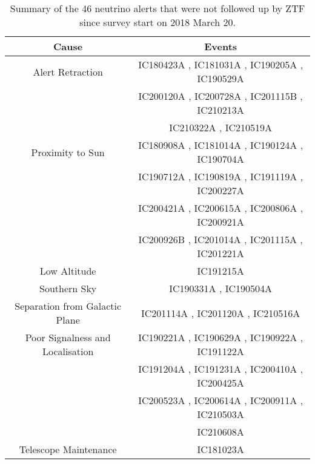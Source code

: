 \begin{table*}
	\centering
	\begin{tabular}{||c c ||} 
		\hline
		\textbf{Cause} & \textbf{Events} \\
		\hline
		Alert Retraction & IC180423A \cite{ic180423a}, IC181031A \cite{ic181031a}, IC190205A \cite{ic190205a}, IC190529A \cite{ic190529a} \\ 
		& IC200120A \cite{ic200120a}, IC200728A \cite{ic200728a}, IC201115B \cite{ic201115b}, IC210213A \cite{ic210213a} \\ 
		& IC210322A \cite{ic210322a}, IC210519A \cite{ic210519a} \\ 
		\hline 
		Proximity to Sun & IC180908A \cite{ic180908a}, IC181014A \cite{ic181014a}, IC190124A \cite{ic190124a}, IC190704A \cite{ic190704a} \\ 
		& IC190712A \cite{ic190712a}, IC190819A \cite{ic190819a}, IC191119A \cite{ic191119a}, IC200227A \cite{ic200227a} \\ 
		& IC200421A \cite{ic200421a}, IC200615A \cite{ic200615a}, IC200806A \cite{ic200806a}, IC200921A \cite{ic200921a} \\ 
		& IC200926B \cite{ic200926b}, IC201014A \cite{ic201014a}, IC201115A \cite{ic201115a}, IC201221A \cite{ic201221a} \\ 
		Low Altitude & IC191215A \cite{ic191215a} \\ 
		Southern Sky & IC190331A \cite{ic190331a}, IC190504A \cite{ic190504a} \\ 
		Separation from Galactic Plane & IC201114A \cite{ic201114a}, IC201120A \cite{ic201120a}, IC210516A \cite{ic210516a} \\ 
		\hline 
		Poor Signalness and Localisation & IC190221A \cite{ic190221a}, IC190629A \cite{ic190629a}, IC190922A \cite{ic190922a}, IC191122A \cite{ic191122a} \\ 
		& IC191204A \cite{ic191204a}, IC191231A \cite{ic191231a}, IC200410A \cite{ic200410a}, IC200425A \cite{ic200425a} \\ 
		& IC200523A \cite{ic200523a}, IC200614A \cite{ic200614a}, IC200911A \cite{ic200911a}, IC210503A \cite{ic210503a} \\ 
		& IC210608A \cite{ic210608a} \\ 
		\hline 
		Telescope Maintenance & IC181023A \cite{ic181023a} \\ 
		\hline 
		
	\end{tabular}
	\caption{Summary of the 46 neutrino alerts that were not followed up by ZTF since survey start on 2018 March 20.}
	\label{tab:nu_non_observed}
\end{table*}





